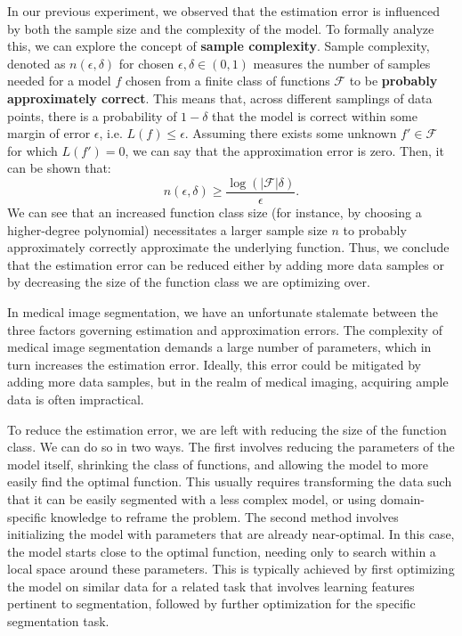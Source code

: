 In our previous experiment, we observed that the estimation error is influenced by both the sample size and the complexity of the model. To formally analyze this, we can explore the concept of \textbf{sample complexity}. Sample complexity, denoted as $n(\epsilon, \delta)$ for chosen $\epsilon, \delta \in (0, 1)$ measures the number of samples needed for a model $f$ chosen from a finite class of functions $\mathcal{F}$ to be \textbf{probably approximately correct}. This means that, across different samplings of data points, there is a probability of $1 - \delta$ that the model is correct within some margin of error $\epsilon$, i.e. $L(f) \leq \epsilon$. Assuming there exists some unknown $f' \in \mathcal{F}$ for which $L(f') = 0$, we can say that the approximation error is zero. Then, it can be shown \cite{shalev-shwartzUnderstandingMachineLearning2014} that:
\begin{equation}
	n(\epsilon, \delta) \geq \frac{\log(\lvert \mathcal{F} \rvert \delta)}{\epsilon}.
\end{equation}
We can see that an increased function class size (for instance, by choosing a higher-degree polynomial) necessitates a larger sample size $n$ to probably approximately correctly approximate the underlying function. Thus, we conclude that the estimation error can be reduced either by adding more data samples or by decreasing the size of the function class we are optimizing over.

In medical image segmentation, we have an unfortunate stalemate between the three factors governing estimation and approximation errors. The complexity of medical image segmentation demands a large number of parameters, which in turn increases the estimation error. Ideally, this error could be mitigated by adding more data samples, but in the realm of medical imaging, acquiring ample data is often impractical.

To reduce the estimation error, we are left with reducing the size of the function class. We can do so in two ways. The first involves reducing the parameters of the model itself, shrinking the class of functions, and allowing the model to more easily find the optimal function. This usually requires transforming the data such that it can be easily segmented with a less complex model, or using domain-specific knowledge to reframe the problem. The second method involves initializing the model with parameters that are already near-optimal. In this case, the model starts close to the optimal function, needing only to search within a local space around these parameters. This is typically achieved by first optimizing the model on similar data for a related task that involves learning features pertinent to segmentation, followed by further optimization for the specific segmentation task.

